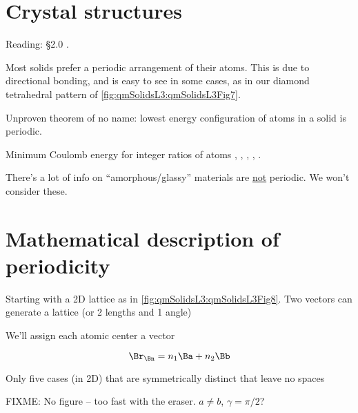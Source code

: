 %
%
\section{Crystal structures}

Reading: \S 2.0 \citep{ibach2009solid}.

Most solids prefer a periodic arrangement of their atoms.  This is due to directional bonding, and is easy to see in some cases, as in our diamond tetrahedral pattern of \cref{fig:qmSolidsL3:qmSolidsL3Fig7}.


Unproven theorem of no name: lowest energy configuration of atoms in a solid is periodic.

Minimum Coulomb energy for integer ratios of atoms
,
,
,
,
.

There's a lot of info on ``amorphous/glassy'' materials are \underline{not} periodic.  We won't consider these.

\section{Mathematical description of periodicity}

Starting with a 2D lattice as in \cref{fig:qmSolidsL3:qmSolidsL3Fig8}.  Two vectors can generate a lattice (or 2 lengths and 1 angle)


We'll assign each atomic center a vector

\begin{dmath}\label{eqn:condensedMatterLecture3:100}
\Br_\Bn = n_1 \Ba + n_2 \Bb
\end{dmath}

Only five cases (in 2D) that are symmetrically distinct that leave no spaces





FIXME: No figure -- too fast with the eraser.  $a \ne b$, $\gamma = \pi/2$?


